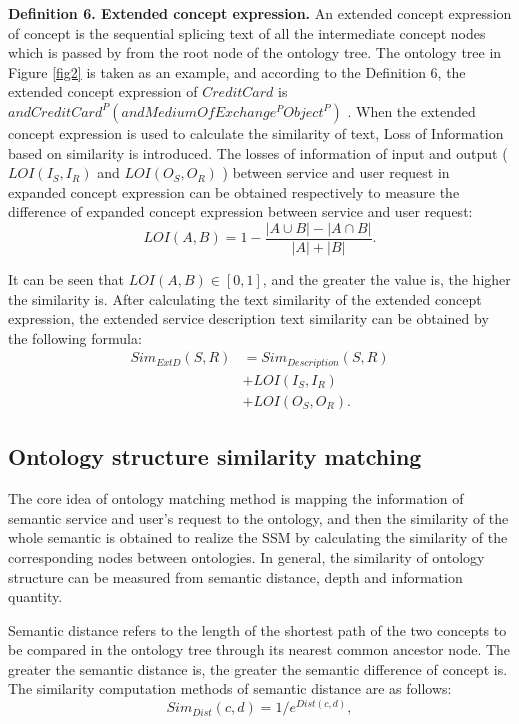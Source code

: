 \documentclass{ieeeaccess}
\begin{document}
\textbf{Definition 6. Extended concept expression.} An extended concept expression of concept is the sequential splicing text of all the intermediate concept nodes which is passed by from the root node of the ontology tree. 
The ontology tree in Figure \ref{fig2} is taken as an example, and according to the Definition 6, the extended concept expression of  $CreditCard$ is $andCreditCard^{P}(andMediumOfExchange^{P}Object^{P})$ . When the extended concept expression is used to calculate the similarity of text, Loss of Information \cite{klusch2009owls} based on similarity is introduced. The losses of information of input and output ( $LOI(I_{S}, I_{R})$ and $LOI(O_{S}, O_{R})$ ) between service and user request in expanded concept expression can be obtained respectively to measure the difference of expanded concept expression between service and user request:
\begin{equation}
LOI\left( A,B \right)=1-\frac{\left| A\cup B \right|-\left| A\cap B \right|}{\left| A \right|+\left| B \right|}.
\end{equation}
 
It can be seen that $LOI\left( A,B \right)\in \left[ 0,1 \right]$, and the greater the value is, the higher the similarity is. After calculating the text similarity of the extended concept expression, the extended service description text similarity can be obtained by the following formula:
\begin{align}
Si{{m}_{ExtD}}\left( S,R \right)&=Si{{m}_{Description}}\left( S,R \right)\nonumber\\
&+LOI\left( I_{S},I_{R} \right)\nonumber\\
&+LOI\left( O_{S},O_{R} \right).
\end{align}

\subsection{Ontology structure similarity matching}
The core idea of ontology matching method is mapping the information of semantic service and user's request to the ontology, and then the similarity of the whole semantic is obtained to realize the SSM by calculating the similarity of the corresponding nodes between ontologies. In general, the similarity of ontology structure can be measured from semantic distance, depth and information quantity.

Semantic distance refers to the length of the shortest path of the two concepts to be compared in the ontology tree through its nearest common ancestor node. The greater the semantic distance is, the greater the semantic difference of concept is. The similarity computation methods of semantic distance are as follows:
\begin{equation}
Si{{m}_{Dist}}\left( c,d \right)={1}/{{{e}^{Dist(c,d)}}},
\end{equation}
 
\end{document}
